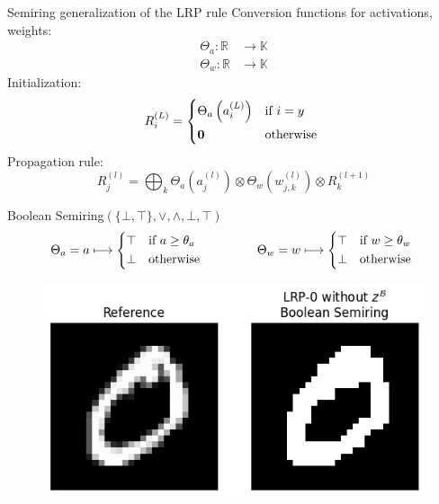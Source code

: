 \documentclass[aspectratio=169]{beamer}
\theoremstyle{definition}
\begin{document}
\begin{frame}{Semiring generalization of the LRP rule}
    Conversion functions for activations, weights:
    \begin{equation*}
        \begin{aligned}
            \Theta_a : \mathbb{R} &\longrightarrow \mathbb{K}\\
            \Theta_w : \mathbb{R} &\longrightarrow \mathbb{K}
        \end{aligned}
    \end{equation*}
    Initialization:
    \begin{equation}
        R^{(L)}_i = \begin{cases*}
            \Theta_a\left(a^{(L)}_i\right) & if $i = y$\\
            \mathbf{0} & otherwise
        \end{cases*}
    \end{equation}
    Propagation rule:
    \begin{equation}
        R^{(l)}_j = \bigoplus_k \Theta_a\left(a^{(l)}_j\right) \otimes \Theta_w\left(w_{j, k}^{(l)}\right) \otimes R^{(l+1)}_k
    \end{equation}
\end{frame}

\begin{frame}{Boolean Semiring}{\large $(\{\bot, \top\}, \lor, \land, \bot, \top)$}
    \begin{equation*}
        \Theta_a = a \longmapsto \begin{cases*}
            \top & if $a\geq\theta_a$\\
            \bot & otherwise
        \end{cases*}
        \qquad\qquad
        \Theta_w = w \longmapsto \begin{cases*}
            \top & if $w\geq\theta_w$\\
            \bot & otherwise
        \end{cases*}
    \end{equation*}

    \begin{figure}[H]
        \centering
        \includegraphics[width=.5\textwidth]{boolean.png}
    \end{figure}
\end{frame}
\end{document}
